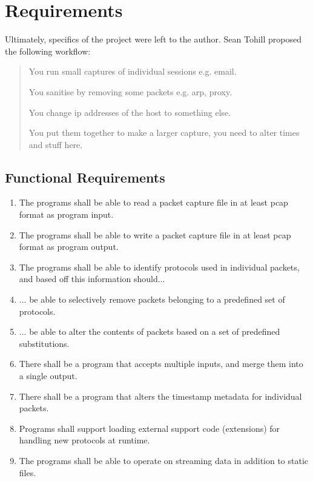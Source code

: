 \documentclass[10pt,a4paper,notitlepage]{report}
\begin{document}
\chapter{Requirements}
Ultimately, specifics of the project were left to the author. Sean Tohill proposed the following workflow:

\begin{quote}
You run small captures of individual sessions e.g. email.

You sanitise by removing some packets e.g. arp, proxy.

You change ip addresses of the host to something else.

You put them together to make a larger capture, you need to alter times and stuff here.

\end{quote}

\section{Functional Requirements}

\begin{enumerate}[label=\bfseries FR\arabic*:]
\item \label{fr:1} The programs shall be able to read a packet capture file in at least pcap format as program input.
\item \label{fr:2} The programs shall be able to write a packet capture file in at least pcap format as program output.
\item \label{fr:3} The programs shall be able to identify protocols used in individual packets, and based off this information should...
\item \label{fr:4} ... be able to selectively remove packets belonging to a predefined set of protocols.
\item \label{fr:5} ... be able to alter the contents of packets based on a set of predefined substitutions.
\item \label{fr:6} There shall be a program that accepts multiple inputs, and merge them into a single output.
\item \label{fr:7} There shall be a program that alters the timestamp metadata for individual packets.
\item \label{fr:8} Programs shall support loading external support code (extensions) for handling new protocols at runtime.
\item \label{fr:9} The programs shall be able to operate on streaming data in addition to static files.
\end{enumerate}
\end{document}
